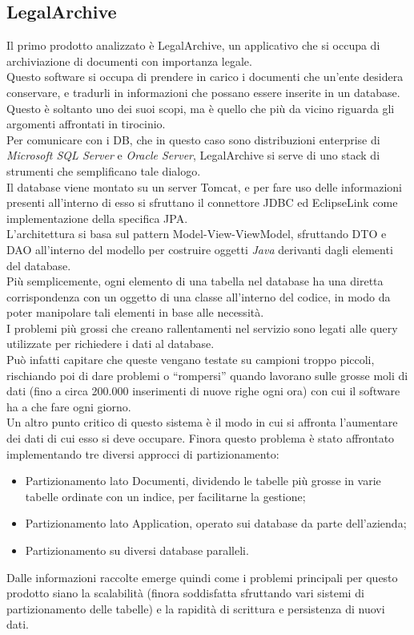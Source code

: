 \subsection{LegalArchive}
Il primo prodotto analizzato è LegalArchive, un applicativo che si occupa di archiviazione di documenti con importanza legale.\\
Questo software si occupa di prendere in carico i documenti che un'ente desidera conservare, e tradurli in informazioni che possano essere inserite in un database.\\
Questo è soltanto uno dei suoi scopi, ma è quello che più da vicino riguarda gli argomenti affrontati in tirocinio.\\
Per comunicare con i DB, che in questo caso sono distribuzioni enterprise di \textit{Microsoft SQL Server} e \textit{Oracle Server}, LegalArchive si serve di uno stack di strumenti che semplificano tale dialogo.\\
Il database viene montato su un server \gls{Tomcat}, e per fare uso delle informazioni presenti all'interno di esso si sfruttano il connettore \gls{JDBC} ed \gls{EclipseLink} come implementazione della specifica \gls{JPA}.\\
L'architettura si basa sul pattern \gls{Model-View-ViewModel}, sfruttando \gls{DTO} e \gls{DAO} all'interno del modello per costruire oggetti \textit{Java} derivanti dagli elementi del database.\\
Più semplicemente, ogni elemento di una tabella nel database ha una diretta corrispondenza con un oggetto di una classe all'interno del codice, in modo da poter manipolare tali elementi in base alle necessità.\\
I problemi più grossi che creano rallentamenti nel servizio sono legati alle query utilizzate per richiedere i dati al database.\\
Può infatti capitare che queste vengano testate su campioni troppo piccoli, rischiando poi di dare problemi o ``rompersi'' quando lavorano sulle grosse moli di dati (fino a circa 200.000 inserimenti di nuove righe ogni ora) con cui il software ha a che fare ogni giorno.\\
Un altro punto critico di questo sistema è il modo in cui si affronta l'aumentare dei dati di cui esso si deve occupare. Finora questo problema è stato affrontato implementando tre diversi approcci di partizionamento:
\begin{itemize}
    \item Partizionamento lato Documenti, dividendo le tabelle più grosse in varie tabelle ordinate con un indice, per facilitarne la gestione;
    \item Partizionamento lato Application, operato sui database da parte dell'azienda;
    \item Partizionamento su diversi database paralleli.
\end{itemize}
Dalle informazioni raccolte emerge quindi come i problemi principali per questo prodotto siano la scalabilità (finora soddisfatta sfruttando vari sistemi di partizionamento delle tabelle) e la rapidità di scrittura e persistenza di nuovi dati.

